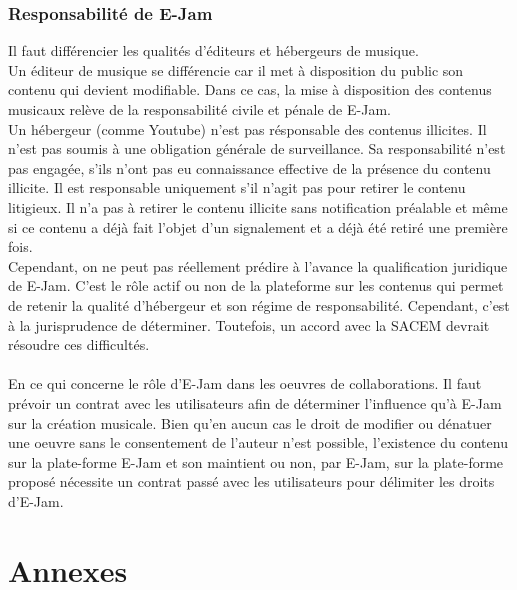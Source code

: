 \documentclass[a4,12pt]{article}
\begin{document}
\subsubsection{Responsabilité de E-Jam}
Il faut différencier les qualités d'éditeurs et hébergeurs de musique.\\
Un éditeur de musique se différencie car il met à disposition du public son contenu qui devient modifiable. Dans ce cas, la mise à disposition des contenus musicaux relève de la responsabilité civile et pénale de E-Jam.\\
Un hébergeur (comme Youtube) n'est pas résponsable des contenus illicites. Il n'est pas soumis à une obligation générale de surveillance. Sa responsabilité n'est pas engagée, s'ils n'ont pas eu connaissance effective de la présence du contenu illicite. Il est responsable uniquement s'il n'agit pas pour retirer le contenu litigieux. Il n'a pas à retirer le contenu illicite sans notification préalable et même si ce contenu a déjà fait l'objet d'un signalement et a déjà été retiré une première fois.\\
Cependant, on ne peut pas réellement prédire à l'avance la qualification juridique de E-Jam. C'est le rôle actif ou non de la plateforme sur les contenus qui permet de retenir la qualité d'hébergeur et son régime de responsabilité. Cependant, c'est à la jurisprudence de déterminer. Toutefois, un accord avec la SACEM devrait résoudre ces difficultés.\\
\\
En ce qui concerne le rôle d'E-Jam dans les oeuvres de collaborations. Il faut prévoir un contrat avec les utilisateurs afin de déterminer l'influence qu'à E-Jam sur la création musicale. Bien qu'en aucun cas le droit de modifier ou dénatuer une oeuvre sans le consentement de l'auteur n'est possible, l'existence du contenu sur la plate-forme E-Jam et son maintient ou non, par E-Jam, sur la plate-forme proposé nécessite un contrat passé avec les utilisateurs pour délimiter les droits d'E-Jam.
\newpage
\section{Annexes}
\end{document}
